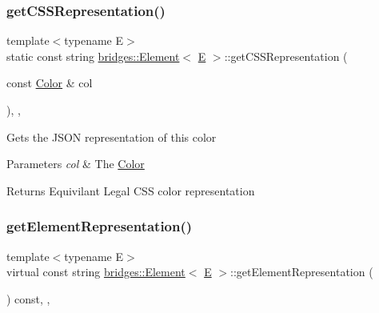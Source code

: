 \subsubsection{\texorpdfstring{getCSSRepresentation()}{getCSSRepresentation()}}
{\footnotesize\ttfamily template$<$typename E$>$ \\
static const string \mbox{\hyperlink{classbridges_1_1_element}{bridges\+::\+Element}}$<$ \mbox{\hyperlink{namespacebridges_acfb0a4f7877d8f63de3e6862004c50eda3a3ea00cfc35332cedf6e5e9a32e94da}{E}} $>$\+::get\+C\+S\+S\+Representation (\begin{DoxyParamCaption}\item[{const \mbox{\hyperlink{classbridges_1_1_color}{Color}} \&}]{col }\end{DoxyParamCaption})\hspace{0.3cm}{\ttfamily [inline]}, {\ttfamily [static]}, {\ttfamily [protected]}}

Gets the J\+S\+ON representation of this color


\begin{DoxyParams}{Parameters}
{\em col} & The \mbox{\hyperlink{classbridges_1_1_color}{Color}} \\
\hline
\end{DoxyParams}
\begin{DoxyReturn}{Returns}
Equivilant Legal C\+SS color representation 
\end{DoxyReturn}
\mbox{\label{classbridges_1_1_element_abfea1b7226b774be648e15f6b2c9daba}} 
\subsubsection{\texorpdfstring{getElementRepresentation()}{getElementRepresentation()}}
{\footnotesize\ttfamily template$<$typename E$>$ \\
virtual const string \mbox{\hyperlink{classbridges_1_1_element}{bridges\+::\+Element}}$<$ \mbox{\hyperlink{namespacebridges_acfb0a4f7877d8f63de3e6862004c50eda3a3ea00cfc35332cedf6e5e9a32e94da}{E}} $>$\+::get\+Element\+Representation (\begin{DoxyParamCaption}{ }\end{DoxyParamCaption}) const\hspace{0.3cm}{\ttfamily [inline]}, {\ttfamily [protected]}, {\ttfamily [virtual]}}

